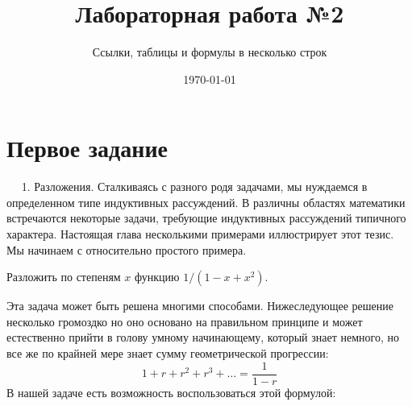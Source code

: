 \documentclass[a4paper,12pt]{article} %
\author{Ссылки, таблицы и формулы в несколько строк}
\title{Лабораторная работа №2}
\date{\today}
\begin{document}
	
	\maketitle %
	
	\section{Первое задание}	
	
	$\quad$
	1. Разложения. Сталкиваясь с разного родя задачами, мы нуждаемся в определенном типе индуктивных рассуждений. В различны областях математики встречаются некоторые задачи, требующие индуктивных рассуждений типичного характера. Настоящая глава несколькими примерами иллюстрирует этот тезис. Мы начинаем с относительно простого примера.
	
	Разложить по степеням $x$ функцию $1 / \left(1 - x + x^2 \right).$
	
	Эта задача может быть решена многими способами. Нижеследующее решение несколько громоздко но оно основано на правильном принципе и может естественно прийти в голову умному начинающему, который знает немного, но все же по крайней мере знает сумму геометрической прогрессии:
	$$1 + r + r^2 + r^3 + \dots = \frac{1}{1 - r}$$
	В нашей задаче есть возможность воспользоваться этой формулой:
\end{document}
